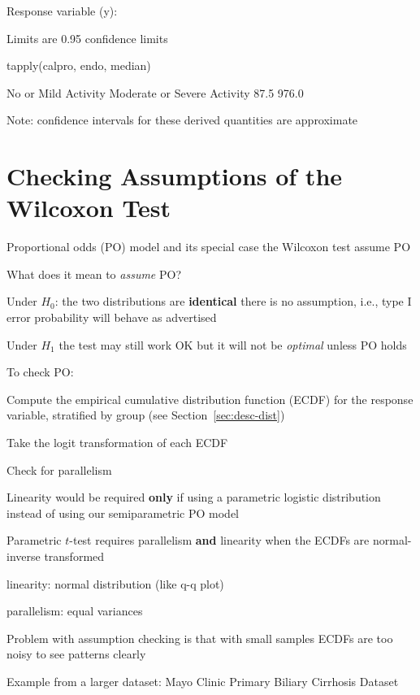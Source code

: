 \begin{Schunk}
\begin{Soutput}
Response variable (y):  

Limits are 0.95 confidence limits
\end{Soutput}
\begin{Sinput}
tapply(calpro, endo, median)
\end{Sinput}
\begin{Soutput}
        No or Mild Activity Moderate or Severe Activity 
                       87.5                       976.0 
\end{Soutput}
\end{Schunk}
\item Note: confidence intervals for these derived quantities are approximate
\ei

\section{Checking Assumptions of the Wilcoxon Test}
\bi
\item Proportional odds (PO) model and its special case the Wilcoxon test assume PO
\item What does it mean to \emph{assume} PO?
 \bi
 \item Under $H_0$: the two distributions are \textbf{identical} there is no assumption, i.e., type I error probability will behave as advertised
 \item Under $H_1$ the test may still work OK but it will not be \emph{optimal} unless PO holds
 \ei
\item To check PO:
 \bi
 \item Compute the empirical cumulative distribution function (ECDF) for the response variable, stratified by group (see Section~\ref{sec:desc-dist})
 \item Take the logit transformation of each ECDF
 \item Check for parallelism
 \item Linearity would be required \textbf{only} if using a parametric logistic distribution instead of using our semiparametric PO model
 \ei
\item Parametric $t$-test requires parallelism \textbf{and} linearity when the ECDFs are normal-inverse transformed
  \bi
  \item linearity: normal distribution (like q-q plot)
  \item parallelism: equal variances
  \ei
\item Problem with assumption checking is that with small samples ECDFs are too noisy to see patterns clearly
\item Example from a larger dataset: Mayo Clinic Primary Biliary Cirrhosis Dataset
